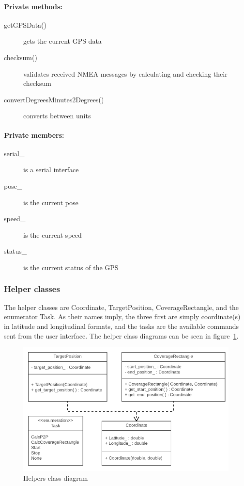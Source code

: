 \paragraph{Private methods:}
\begin{adjustwidth}{2.5em}{0pt}\begin{description}
		\item [getGPSData()] gets the current GPS data
		\item [checksum()] validates received NMEA messages by calculating and checking their checksum
		\item [convertDegreesMinutes2Degrees()] converts between units
\end{description}\end{adjustwidth}

\paragraph{Private members:}
\begin{adjustwidth}{2.5em}{0pt}\begin{description}
		\item [serial_] is a serial interface
		\item [pose_] is the current pose
		\item [speed_] is the current speed
		\item [status_] is the current status of the GPS
\end{description}\end{adjustwidth}

\subsubsection{Helper classes}

The helper classes are Coordinate, TargetPosition, CoverageRectangle, and the enumerator Task. As their names imply, the three first are simply coordinate(s) in latitude and longitudinal formats, and the tasks are the available commands sent from the user interface. The helper class diagrams can be seen in figure~\ref{fig:helpers}.

\begin{figure}[H]
\centering
\includegraphics[width=1\linewidth]{Images/Design/Helpers_class_diagram}
\caption{Helpers class diagram}
\label{fig:helpers}
\end{figure}

